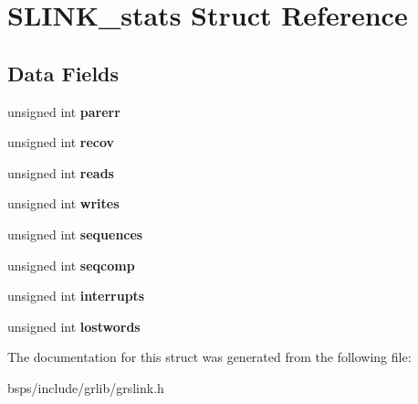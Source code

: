 \hypertarget{structSLINK__stats}{}\section{S\+L\+I\+N\+K\+\_\+stats Struct Reference}
\label{structSLINK__stats}
\subsection*{Data Fields}
\begin{DoxyCompactItemize}
\item 
\mbox{\label{structSLINK__stats_a80fa98cc40201f3afc19b0742b926ade}} 
unsigned int {\bfseries parerr}
\item 
\mbox{\label{structSLINK__stats_a4986aa0ac2505882bd41afb8a4fe9e76}} 
unsigned int {\bfseries recov}
\item 
\mbox{\label{structSLINK__stats_a0a5df1e18436b5ac27c7e6d750d26e21}} 
unsigned int {\bfseries reads}
\item 
\mbox{\label{structSLINK__stats_a3fc11ca0b59de560ea62eaf1589fc9a8}} 
unsigned int {\bfseries writes}
\item 
\mbox{\label{structSLINK__stats_ab05d4f774c9d0c8b9bb4f6770e4d14c8}} 
unsigned int {\bfseries sequences}
\item 
\mbox{\label{structSLINK__stats_af6ab32091bb2d1d395524e4dfaa68725}} 
unsigned int {\bfseries seqcomp}
\item 
\mbox{\label{structSLINK__stats_a306a4c2992b3f84fe218d581f4ca63de}} 
unsigned int {\bfseries interrupts}
\item 
\mbox{\label{structSLINK__stats_a3d8e9aaec020760765a44a4970ff8db0}} 
unsigned int {\bfseries lostwords}
\end{DoxyCompactItemize}


The documentation for this struct was generated from the following file\+:\begin{DoxyCompactItemize}
\item 
bsps/include/grlib/grslink.\+h\end{DoxyCompactItemize}
